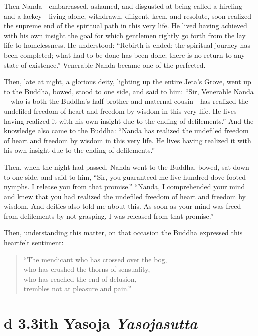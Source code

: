 \documentclass[12pt,openany]{book}%
\newcommand*{\suttatitleacronym}[1]{\smaller[2]{#1}\vspace*{.3em}}
\newcommand*{\suttatitletranslation}[1]{\linebreak{#1}}
\newcommand*{\suttatitleroot}[1]{\linebreak\smaller[2]\itshape{#1}}
\newcommand*{\tocacronym}[1]{\hspace*{-3.3em}{#1}\quad}
\newcommand*{\toctranslation}[1]{#1}
\newcommand*{\tocroot}[1]{(\textit{#1})}
\begin{document}
Then Nanda—embarrassed, ashamed, and disgusted at being called a hireling and a lackey—living alone, withdrawn, diligent, keen, and resolute, soon realized the supreme end of the spiritual path in this very life. He lived having achieved with his own insight the goal for which gentlemen rightly go forth from the lay life to homelessness. He understood: “Rebirth is ended; the spiritual journey has been completed; what had to be done has been done; there is no return to any state of existence.” Venerable Nanda became one of the perfected. 

Then, late at night, a glorious deity, lighting up the entire Jeta’s Grove, went up to the Buddha, bowed, stood to one side, and said to him: “Sir, Venerable Nanda—who is both the Buddha’s half-brother and maternal cousin—has realized the undefiled freedom of heart and freedom by wisdom in this very life. He lives having realized it with his own insight due to the ending of defilements.” And the knowledge also came to the Buddha: “Nanda has realized the undefiled freedom of heart and freedom by wisdom in this very life. He lives having realized it with his own insight due to the ending of defilements.” 

Then, when the night had passed, Nanda went to the Buddha, bowed, sat down to one side, and said to him, “Sir, you guaranteed me five hundred dove-footed nymphs. I release you from that promise.” “Nanda, I comprehended your mind and knew that you had realized the undefiled freedom of heart and freedom by wisdom. And deities also told me about this. As soon as your mind was freed from defilements by not grasping, I was released from that promise.” 

Then, understanding this matter, on that occasion the Buddha expressed this heartfelt sentiment: 

\begin{verse}%
“The mendicant who has crossed over the bog, \\
who has crushed the thorns of sensuality, \\
who has reached the end of delusion, \\
trembles not at pleasure and pain.” 

%
\end{verse}

%
\section*{{\suttatitleacronym Ud 3.3}{\suttatitletranslation With Yasoja }{\suttatitleroot Yasojasutta}}
\addcontentsline{toc}{section}{\tocacronym{Ud 3.3} \toctranslation{With Yasoja } \tocroot{Yasojasutta}}
\end{document}
